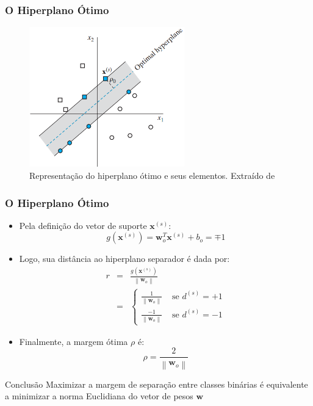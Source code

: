 \documentclass{beamer}
\begin{document}
\begin{frame}
	\frametitle{O Hiperplano Ótimo}
	\begin{figure}[h!]
		\centering
		\includegraphics[width=0.6\textwidth]{fig03.png}
		\caption{Representação do hiperplano ótimo e seus elementos. Extraído de \cite{haykin}}
		\label{fig:haykin-01}
	\end{figure}
\end{frame}


\begin{frame}
	\frametitle{O Hiperplano Ótimo}
	
	\begin{itemize}
		\item Pela definição do vetor de suporte $\textbf{x}^{(s)}$:
		\begin{equation}
			g(\textbf{x}^{(s)})=\textbf{w}^T_o\textbf{x}^{(s)} + b_o = \mp 1
			\label{eq:support-vectors}
		\end{equation}	
		\item Logo, sua distância ao hiperplano separador é dada por:
		\begin{eqnarray}
		r &=& \frac{g(\textbf{x}^{(s)})}{\left \| \textbf{w}_o \right \|} \\
		  &=& \begin{cases}
			\frac{1}{\left \| \textbf{w}_o \right \|} & \text{ se } d^{(s)}= +1\\ 
			\frac{-1}{\left \| \textbf{w}_o \right \|}& \text{ se } d^{(s)}= -1 
		\end{cases}
		\end{eqnarray}
		\item Finalmente, a margem ótima $\rho$ é:
		\begin{equation}
			\rho = \frac{2}{\left \| \textbf{w}_o \right \|}
			\label{eq:margin-opt}
		\end{equation}
	\end{itemize}	
	
	\begin{block}{Conclusão}
		Maximizar a margem de separação entre classes binárias é equivalente a minimizar a norma Euclidiana do vetor de pesos $\textbf{w}$
	\end{block}

\end{frame}
\end{document}
